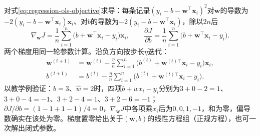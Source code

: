 对式\eqref{eq:regression-ols-objective}求导：每条记录$(y_i-b-\bm{w}^{\top}\bm{x}_i)^2$对$\bm{w}$的导数为$-2(y_i-b-\bm{w}^{\top}\bm{x}_i)\bm{x}_i$、对$b$的导数为$-2(y_i-b-\bm{w}^{\top}\bm{x}_i)$，除以$2n$后
\[
  \nabla_{\bm w}J
  =\frac1n\sum_{i=1}^{n}\bigl(b+\bm{w}^{\top}\bm{x}_i-y_i\bigr)\bm{x}_i,
  \qquad
  \frac{\partial J}{\partial b}
  =\frac1n\sum_{i=1}^{n}\bigl(b+\bm{w}^{\top}\bm{x}_i-y_i\bigr).
\]
两个梯度用同一轮参数计算。沿负方向按步长$\eta$迭代：
\begin{align}
  \bm{w}^{(t+1)}
  &=\bm{w}^{(t)}-\frac{\eta}{n}\sum_{i=1}^{n}\bigl(b^{(t)}+\bm{w}^{(t)\top}\bm{x}_i-y_i\bigr)\bm{x}_i,\\
  b^{(t+1)}
  &=b^{(t)}-\frac{\eta}{n}\sum_{i=1}^{n}\bigl(b^{(t)}+\bm{w}^{(t)\top}\bm{x}_i-y_i\bigr).
  \label{eq:regression-ols-gradient}
\end{align}
以教学例验证：$\widehat b=3$、$\widehat w=2$时，四项$b+wx_i-y_i$分别为$3+0-2=1$、$3+0-4=-1$、$3+2-4=1$、$3+2-6=-1$；$\partial J/\partial b=(1-1+1-1)/4=0$，$\nabla_{\bm w}J$中各项乘$x_i$后为$0,0,1,-1$，和为零，偏导数确实在该处为零。梯度置零给出关于$(\bm{w},b)$的线性方程组（正规方程），也可一次解出闭式参数。

